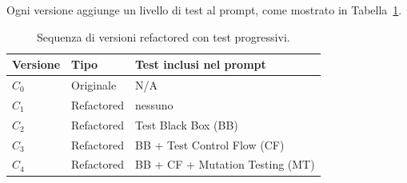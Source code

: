 Ogni versione aggiunge un livello di test al prompt, come mostrato in
Tabella~\ref{tab:m4-versions}.

\begin{table}[h!]
\centering
\small
\begin{tabular}{@{}lll@{}}
\toprule
\textbf{Versione} & \textbf{Tipo} & \textbf{Test inclusi nel prompt} \\
\midrule
$C_0$ & Originale  & N/A \\
$C_1$ & Refactored & nessuno \\
$C_2$ & Refactored & Test Black Box (BB) \\
$C_3$ & Refactored & BB + Test Control Flow (CF) \\
$C_4$ & Refactored & BB + CF + Mutation Testing (MT) \\
\bottomrule
\end{tabular}
\caption{Sequenza di versioni refactored con test progressivi.}
\label{tab:m4-versions}
\end{table}
